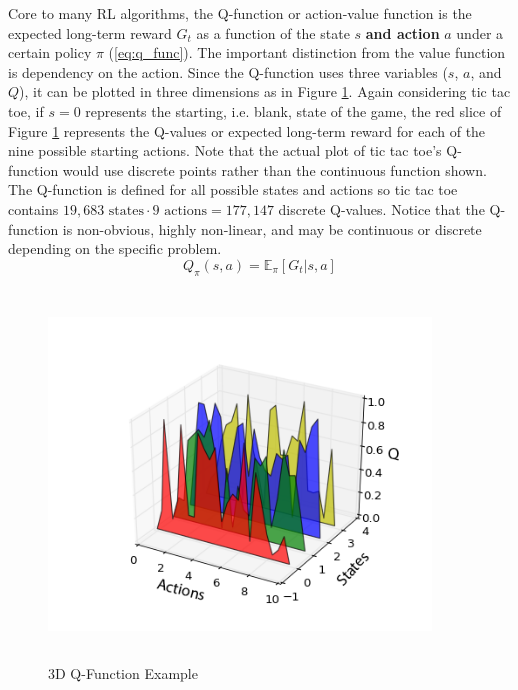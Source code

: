 Core to many RL algorithms, the Q-function or action-value function is the expected long-term reward $G_t$ as a function of the state $s$ \textbf{and action} $a$ under a certain policy $\pi$ (\ref{eq:q_func}). The important distinction from the value function is dependency on the action. Since the Q-function uses three variables ($s$, $a$, and $Q$), it can be plotted in three dimensions as in Figure \ref{fig:q_ex_plot}. Again considering tic tac toe, if $s=0$ represents the starting, i.e. blank, state of the game, the red slice of Figure \ref{fig:q_ex_plot} represents the Q-values or expected long-term reward for each of the nine possible starting actions. Note that the actual plot of tic tac toe's Q-function would use discrete points rather than the continuous function shown. The Q-function is defined for all possible states and actions so tic tac toe contains $19,683 \text{ states} \cdot 9 \text{ actions} = 177,147$ discrete Q-values. Notice that the Q-function is non-obvious, highly non-linear, and may be continuous or discrete depending on the specific problem.
\begin{equation}
	\label{eq:q_func}
	Q_\pi(s,a)=\mathbb{E}_\pi [G_t |s,a]
\end{equation}
\begin{figure}[H]   %
	\centering \includegraphics[width=4in, height=3.85in, keepaspectratio]{figures/q_ex_plot.png}
	\caption{3D Q-Function Example}\label{fig:q_ex_plot}
\end{figure}


